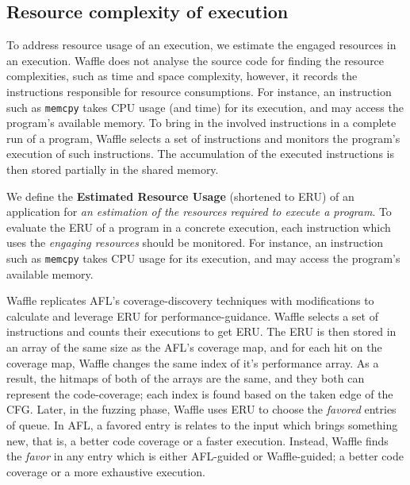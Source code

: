 \subsection{Resource complexity of execution}


To address resource usage of an execution, we estimate the engaged resources in an execution. Waffle does not analyse the source code for finding the resource complexities, such as time and space complexity, however, it records the instructions responsible for resource consumptions. For instance, an instruction such as \texttt{memcpy} takes CPU usage (and time) for its execution, and may access the program's available memory. To bring in the involved instructions in a complete run of a program, Waffle selects a set of instructions and monitors the program's execution of such instructions. The accumulation of the executed instructions is then stored partially in the shared memory.


We define the \textbf{Estimated Resource Usage} (shortened to ERU) of an application for \textit{an estimation of the resources required to execute a program}. To evaluate the ERU of a program in a concrete execution, each instruction which uses the \textit{engaging resources} should be monitored. For instance, an instruction such as \texttt{memcpy} takes CPU usage for its execution, and may access the program's available memory.  


Waffle replicates AFL's coverage-discovery techniques with modifications to calculate and leverage ERU for performance-guidance. Waffle selects a set of instructions and counts their executions to get ERU. The ERU is then stored in an array of the same size as the AFL's coverage map, and for each hit on the coverage map, Waffle changes the same index of it's performance array. As a result, the hitmaps of both of the arrays are the same, and they both can represent the code-coverage; each index is found based on the taken edge of the CFG. Later, in the fuzzing phase, Waffle uses ERU to choose the \textit{favored} entries of queue. In AFL, a favored entry is relates to the input which brings something new, that is, a better code coverage or a faster execution. Instead, Waffle finds the \textit{favor} in any entry which is either AFL-guided or Waffle-guided; a better code coverage or a more exhaustive execution.

